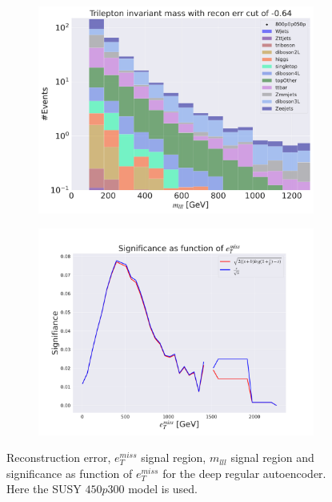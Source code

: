 \begin{figure}[H]
    \hfill
    \begin{subfigure}{.49\textwidth}
        \includegraphics[width=\textwidth]{Figures/AE_testing/big/3lep/b_data_recon_big_rm3_feats_sig_800p0p050p_mlll_recon_errcut_-0.64.pdf}
        \caption{}
        \label{fig:AE_3lep_big_mlll_800_3}
    \end{subfigure}
    \hfill   
    \begin{subfigure}{.49\textwidth}
        \includegraphics[width=\textwidth]{Figures/AE_testing/big/3lep/significance_etmiss_800p0p050p_-0.6363296281507171.pdf}
        \caption{}
        \label{fig:AE_3lep_big_signi_800_3}
    \end{subfigure}
    \hfill      
    \caption[3lep deep network | $800p50$ | AE | 3]{Reconstruction error, $e_T^{miss}$ signal region, $m_{lll}$ signal region and significance as function of 
    $e_T^{miss}$ for the deep regular autoencoder. Here the SUSY $450p300$ model is used.}
    \label{fig:AE_3lep_big_rec_sig_signi_800_3}
\end{figure}

